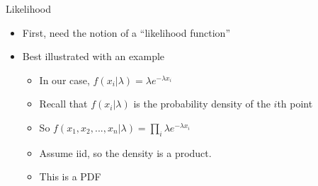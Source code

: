 \documentclass[aspectratio=169]{beamer}
\begin{document}
\begin{frame}{Likelihood}

\begin{itemize}
\item First, need the notion of a ``likelihood function''
\item Best illustrated with an example
\begin{itemize}
\item In our case, $f (x_i | \lambda) = \lambda e^{-\lambda x_i}$
\item Recall that $f (x_i | \lambda)$ is the probability density of the $i$th point
\item So $f(x_1, x_2, ..., x_n | \lambda) = \prod_i \lambda e^{-\lambda x_i}$ 
\item Assume iid, so the density is a product. %
\item This is a PDF
\end{itemize}
\end{itemize}
\end{frame}
\end{document}
